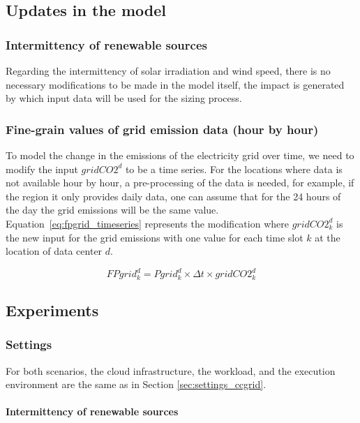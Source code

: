 \subsection{Updates in the model}

\subsubsection{Intermittency of renewable sources}

Regarding the intermittency of solar irradiation and wind speed, there is no necessary modifications to be made in the model itself, the impact is generated by which input data will be used for the sizing process.

\subsubsection{Fine-grain values of grid emission data (hour by hour)}

To model the change in the emissions of the electricity grid over time, we need to modify the input $gridCO2^d$ to be a time series. For the locations where data is not available hour by hour, a pre-processing of the data is needed, for example, if the region it only provides daily data, one can assume that for the 24 hours of the day the grid emissions  will be the same value. Equation~\eqref{eq:fpgrid_timeseries} represents the modification where $gridCO2^d_k$ is the new input for the grid emissions with one value for each time slot $k$ at the location of data center $d$.


\begin{equation} \label{eq:fpgrid_timeseries}
FPgrid_k^d = Pgrid_k^d\times \Delta t \times gridCO2^d_k
\end{equation}

\subsection{Experiments}

\subsubsection{Settings}


For both scenarios, the cloud infrastructure, the workload, and the execution environment are the same as in Section  \ref{sec:settings_ccgrid}.

\paragraph{Intermittency of renewable sources}

